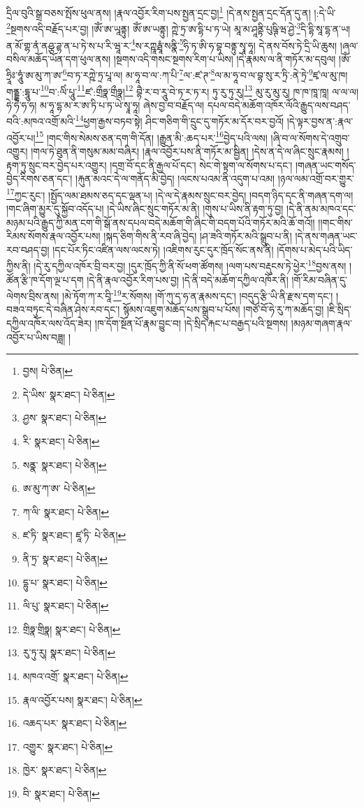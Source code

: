དྲིལ་བུའི་སྒྲ་བཅས་སྤོས་ཕུལ་ནས། །རྣལ་འབྱོར་རིག་པས་སྤྱན་དྲང་བྱ།\footnote{བྱས།  པེ་ཅིན། } །དེ་ནས་སྤྱན་དྲང་དོན་དུ་ན། །:དེ་ཡི་\footnote{དེ་ཡིས་  སྣར་ཐང་།  པེ་ཅིན། }སྔགས་འདི་བརྗོད་པར་བྱ། །ཨོཾ་ཨ་ཡཱནྟུ། ཨོཾ་ཨ་ཡནྟུ། ཀྵེ་ཏྲ་ཨ་དྷི་པ་ཏ་ཡེ། མཱ་མ་ཤཱནྟི་པུཥྚི་ཝ་ཤྱེ་\footnote{ཤྱས་  སྣར་ཐང་།  པེ་ཅིན། }དི་དྷི་སཱ་དྷ་ན་ཡ། ན་མོ་གྷ་ནཾ་ནཤྩ་ཌྷ་ན་པ་ཏེ་ས་པ་རི་ཝཱ་ར་\footnote{རི་  སྣར་ཐང་།  པེ་ཅིན། }ས་རཀྵཱརྠཱཾ་སནྣི་\footnote{སནྣ་  སྣར་ཐང་།  པེ་ཅིན། }ཧི་ཏ་ཨི་ཧ་བྷ་བནྟུ་སྭཱ་ཧཱ། དེ་ནས་བོས་ཏེ་དྲི་ཡི་ཆུས། །ཞལ་བསིལ་མཆོད་ཡོན་དག་ཕུལ་ནས། །སྔགས་འདི་གསང་སྔགས་རིག་པ་ཡིས། །དེ་རྣམས་ལ་ནི་གཏོར་མ་དབུལ། །ཨོཾ་ཧྲཱིཿ་ཧཱུཾ་ཨ་མུ་ཀ་ཨ་\footnote{ཨ་མུ་ཀ་ཨ་  པེ་ཅིན། }བ་ཏ་རཀྵེ་ཏྲ་པཱ་ལ། མ་ཧཱ་བ་ལ་:ཀ་པི་\footnote{ཀ་ལི་  སྣར་ཐང་།  པེ་ཅིན། }ལ་:ཛ་ཊ་\footnote{ཛ་ཏི་  སྣར་ཐང་། ཛཱ་ཏི་  པེ་ཅིན། }ལ་མ་ཧཱ་བ་ལ་བྷ་སུ་ར་ཏྲི་:ནེ་ཏྲེ་\footnote{ནི་ཏྲ་  སྣར་ཐང་།  པེ་ཅིན། }ཛྭ་ལ་མུ་ཁ། གནྡྷ་:དྷཱུ་པ་\footnote{དྷུ་པ་  སྣར་ཐང་།  པེ་ཅིན། }བ་:ལིཾ་པཱུ་\footnote{ལི་པུ་  སྣར་ཐང་།  པེ་ཅིན། }ཛ་:གྲྀཧྣ་གྲྀཧྣ།\footnote{གྲིཧྣ་གྲིཧྣ།  སྣར་ཐང་།  པེ་ཅིན། } བྷཻ་ར་བ་རཱུ་བེ་ཏ་ར་ཏ་ར། ཏུ་རུ་ཏུ་རུ།\footnote{རུ་ཏུ་རུ།  སྣར་ཐང་།  པེ་ཅིན། } མུ་རུ་མུ་རུ། ཁ་ཁ་ཁཱ་ཁཱ། ལ་ལ་ལ། ཧེ་ཧེ་ཧ་ཧ། མ་ཧཱ་དྷ་མ་ར་ཨ་ཏི་པ་ཏ་ཡེ་སྭཱ་ཧཱ། ཞེས་བྱ་བ་བརྗོད་ལ། དཔལ་བདེ་མཆོག་འཁོར་ལོའི་རྒྱུད་ལས་བཤད་བའི་:མཁའ་འགྲོ་མའི་\footnote{མཁའ་འགྲོ་  སྣར་ཐང་།  པེ་ཅིན། }ཕྱག་རྒྱས་བཏབ་སྟེ། ཤིང་གཅིག་གི་དྲུང་དུ་གཏོར་མ་དོར་བར་བྱའོ། །དེ་ལྟར་བྱས་ན་:རྣལ་འབྱོར་པ།\footnote{རྣལ་འབྱོར་པས།  སྣར་ཐང་།  པེ་ཅིན། } །གང་གིས་སེམས་ཅན་དག་གི་དོན། །རྒྱུན་མི་:ཆད་པར་\footnote{འཆད་པར་  སྣར་ཐང་།  པེ་ཅིན། }བྱེད་པའི་ལས། །ཞི་བ་ལ་སོགས་དེ་འགྲུབ་འགྱུར། །གལ་ཏེ་ཐུན་ནི་གསུམ་མམ་བཞིར། །རྣལ་འབྱོར་པས་ནི་གཏོར་མ་སྦྱིན། །དེས་ན་དེ་ལ་ཞིང་སྲུང་རྣམས། །རྟག་ཏུ་སྲུང་བར་བྱེད་པར་འགྱུར། །དགྲ་བོ་དང་ནི་རྒྱལ་པོ་དང་། སེང་གེ་སྟག་ལ་སོགས་པ་དང་། །གཞན་ཡང་གསོད་བྱེད་རིགས་ཅན་དང་། །རྐུན་མའང་དེ་ལ་གནོད་མི་བྱེད། །ལངས་པའམ་ནི་འདུག་པ་འམ། །ཉལ་ལམ་འགྲོ་བར་གྱུར་\footnote{འགྱུར་  སྣར་ཐང་།  པེ་ཅིན། }ཀྱང་རུང་། །སྤྱོད་ལམ་ཐམས་ཅད་དང་ལྡན་པ། །དེ་ལ་དེ་རྣམས་སྲུང་བར་བྱེད། །བདག་ཉིད་དང་ནི་གཞན་དག་ལ། །གང་ཞིག་མྱུར་དུ་སྐྱོབ་འདོད་པ། །དེ་ཡིས་ཞིང་སྲུང་གཏོར་མ་ནི། །གུས་པ་ཡིས་ནི་རྟག་ཏུ་བྱ། །དེ་ནི་ནམ་མཁའ་དང་མཉམ་པའི་རྒྱུད་ཀྱི་མན་ངག་གི་སྒོ་ནས་དཔལ་བདེ་མཆོག་གི་ཞིང་གི་བདག་པོའི་གཏོར་མའི་ཆོ་གའོ།། །།གང་གིས་རིམས་སོགས་རྣལ་འབྱོར་པས། །སྐད་ཅིག་གིས་ནི་རབ་ཞི་བྱེད། །ཤ་ཟའི་གཏོར་མའི་སྒྲུབ་པ་ནི། །དེ་ནས་གཞན་ཡང་རབ་བཤད་བྱ། །དང་པོར་ཏིང་འཛིན་ལས་ལངས་ཏེ། །འཇིགས་རུང་དུར་ཁྲོད་སོང་ནས་ནི། །དོགས་པ་མེད་པའི་ཡིད་ཀྱིས་ནི། །དེ་རུ་དཀྱིལ་འཁོར་བྲི་བར་བྱ། །དུར་ཁྲོད་ཀྱི་ནི་སོ་ཕག་ཚོགས། །ལག་པས་བརྡུངས་ཏེ་ཕྱེར་\footnote{ཁྱེར་  སྣར་ཐང་།  པེ་ཅིན། }བྱས་ནས། །ཚོན་རྩི་ཁ་དོག་ལྔ་པ་དག །དེ་ནི་རྣལ་འབྱོར་རིག་པས་བྱ། །དེ་ནི་བདེ་མཆོག་དཀྱིལ་འཁོར་ནི། །གོ་རིམ་བཞིན་དུ་ལེགས་བྲིས་ནས། །མེ་ཏོག་ཀ་ར་བཱི་\footnote{བི་  སྣར་ཐང་།  པེ་ཅིན། }ར་སོགས། །གོ་ཀུ་ད་ཧ་ན་རྣམས་དང་། །བདུད་རྩི་ཡི་ནི་རྫས་དག་དང་། །བཟའ་བཏུང་དེ་བཞིན་ཤེས་རབ་དང་། སྙོམས་འཇུག་མཆོད་པས་སྒྲུབ་པ་པོས། །གཙོ་བོ་ཧེ་རུ་ཀ་མཆོད་བྱ། །ཇི་སྲིད་དཀྱིལ་འཁོར་ལས་འོད་ཟེར། །ཁ་དོག་སྔོན་པོ་རྣམ་བྱུང་བ། །དེ་སྲིད་རྐང་པ་བརྒྱད་པའི་སྔགས། །མཉམ་གཞག་རྣལ་འབྱོར་པ་ཡིས་བཟླ། །
